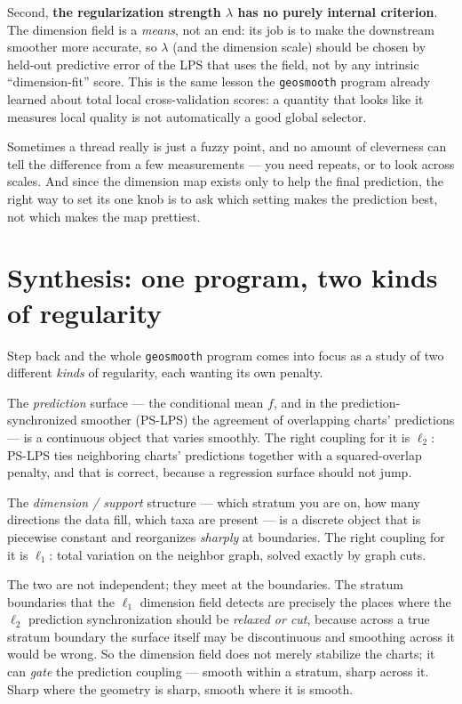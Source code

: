 \documentclass[11pt]{article}
\theoremstyle{definition}
\theoremstyle{remark}
\begin{document}
Second, \textbf{the regularization strength $\lambda$ has no purely internal
criterion}. The dimension field is a \emph{means}, not an end: its job is to make
the downstream smoother more accurate, so $\lambda$ (and the dimension scale)
should be chosen by held-out predictive error of the LPS that uses the field, not
by any intrinsic ``dimension-fit'' score. This is the same lesson the
\texttt{geosmooth} program already learned about total local cross-validation
scores: a quantity that looks like it measures local quality is not automatically a
good global selector.

\begin{plain}
Sometimes a thread really is just a fuzzy point, and no amount of cleverness can
tell the difference from a few measurements --- you need repeats, or to look across
scales. And since the dimension map exists only to help the final prediction, the
right way to set its one knob is to ask which setting makes the prediction best,
not which makes the map prettiest.
\end{plain}

\section{Synthesis: one program, two kinds of regularity}\label{sec:synthesis}

Step back and the whole \texttt{geosmooth} program comes into focus as a study of
two different \emph{kinds} of regularity, each wanting its own penalty.

The \emph{prediction} surface --- the conditional mean $f$, and in the
prediction-synchronized smoother (PS-LPS) the agreement of overlapping charts'
predictions --- is a continuous object that varies smoothly. The right coupling
for it is $\ell_2$: PS-LPS ties neighboring charts' predictions together with a
squared-overlap penalty, and that is correct, because a regression surface should
not jump.

The \emph{dimension / support} structure --- which stratum you are on, how many
directions the data fill, which taxa are present --- is a discrete object that is
piecewise constant and reorganizes \emph{sharply} at boundaries. The right coupling
for it is $\ell_1$: total variation on the neighbor graph, solved exactly by graph
cuts.

The two are not independent; they meet at the boundaries. The stratum boundaries
that the $\ell_1$ dimension field detects are precisely the places where the
$\ell_2$ prediction synchronization should be \emph{relaxed or cut}, because across
a true stratum boundary the surface itself may be discontinuous and smoothing
across it would be wrong. So the dimension field does not merely stabilize the
charts; it can \emph{gate} the prediction coupling --- smooth within a stratum,
sharp across it. Sharp where the geometry is sharp, smooth where it is smooth.
\end{document}
